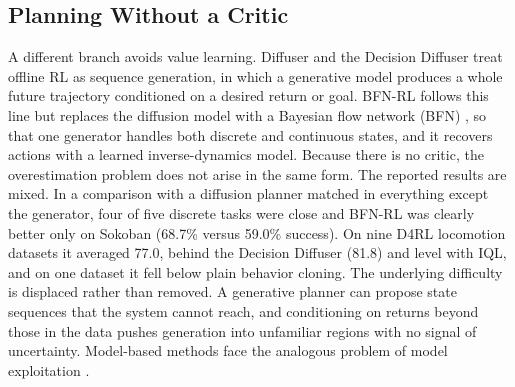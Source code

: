 \documentclass[conference]{IEEEtran}
\begin{document}
\subsection{Planning Without a Critic}
A different branch avoids value learning. Diffuser \cite{janner2022diffuser} and the Decision Diffuser \cite{ajay2023decisiondiffuser} treat offline RL as sequence generation, in which a generative model produces a whole future trajectory conditioned on a desired return or goal. BFN-RL \cite{killingberg2026bfn} follows this line but replaces the diffusion model with a Bayesian flow network (BFN) \cite{graves2023bfn}, so that one generator handles both discrete and continuous states, and it recovers actions with a learned inverse-dynamics model. Because there is no critic, the overestimation problem does not arise in the same form. The reported results are mixed. In a comparison with a diffusion planner matched in everything except the generator, four of five discrete tasks were close and BFN-RL was clearly better only on Sokoban (68.7\% versus 59.0\% success). On nine D4RL locomotion datasets it averaged 77.0, behind the Decision Diffuser (81.8) and level with IQL, and on one dataset it fell below plain behavior cloning. The underlying difficulty is displaced rather than removed. A generative planner can propose state sequences that the system cannot reach, and conditioning on returns beyond those in the data pushes generation into unfamiliar regions with no signal of uncertainty. Model-based methods face the analogous problem of model exploitation \cite{he2023survey}.
\end{document}
